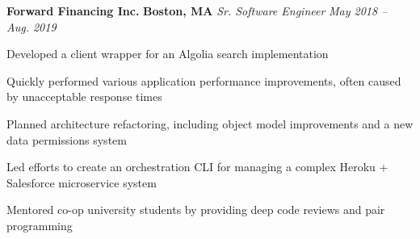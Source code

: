 \item
\headerrow
{\textbf{Forward Financing Inc.}}
{\textbf{Boston, MA}}
\headerrow
{\emph{Sr. Software Engineer}}
{\emph{May 2018 -- Aug. 2019}}
\begin{itemize*}
    \item Developed a client wrapper for an Algolia search implementation
    \item Quickly performed various application performance improvements, often
    caused by unacceptable response times
    \item Planned architecture refactoring, including object model
    improvements and a new data permissions system
    \item Led efforts to create an orchestration CLI for managing a complex
    Heroku + Salesforce microservice system
    \item Mentored co-op university students by providing deep code reviews
    and pair programming
\end{itemize*}
